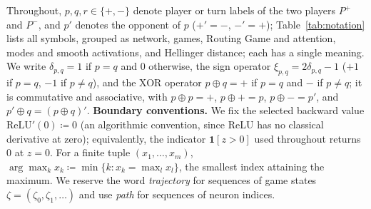 \documentclass[twoside]{article}
\newcommand{\1}{\mathbf{1}}
\begin{document}
Throughout, $p, q, r \in \{+, -\}$ denote player or turn labels of the two players $P^+$ and $P^-$,
and $p'$ denotes the opponent of $p$ ($+' = -$, $-' = +$); Table~\ref{tab:notation} lists all
symbols, grouped as network, games, Routing Game and attention, modes and smooth activations, and
Hellinger distance; each has a single meaning. We write $\delta_{p,q} = 1$ if $p=q$ and $0$
otherwise, the sign operator $\xi_{p,q} = 2\delta_{p,q} - 1$ ($+1$ if $p=q$, $-1$ if $p \neq q$),
and the XOR operator $p \oplus q = +$ if $p=q$ and $-$ if $p \neq q$; it is commutative and
associative, with $p \oplus p = +$, $p \oplus + = p$, $p \oplus - = p'$, and $p' \oplus q = (p
    \oplus q)'$.
\textbf{Boundary conventions.} We fix the selected backward value $\mathrm{ReLU}'(0)\coloneqq0$ (an algorithmic convention, since ReLU has no classical derivative at zero); equivalently, the indicator
$\1[z > 0]$ used throughout returns $0$ at $z = 0$. For a finite tuple $(x_1, \dots, x_m)$,
$\arg\max_k x_k \coloneqq \min\{k : x_k = \max_l x_l\}$, the smallest index attaining the maximum.
We reserve the word \emph{trajectory} for sequences of game states $\zeta = (\zeta_0, \zeta_1,
    \dots)$ and use \emph{path} for sequences of neuron indices.
\end{document}
